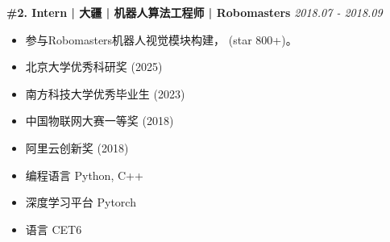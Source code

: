 \documentclass{resume}
\begin{document}
\textbf{\#2. Intern | 大疆 | 机器人算法工程师 | Robomasters}
\hfill \textit{2018.07 - 2018.09}\\\vspace{-15pt}%
\begin{itemize}[label=\textbullet, leftmargin=*]
\item 参与Robomasters机器人视觉模块构建， (star 800+)。
\end{itemize}


\begin{itemize}
\item 北京大学优秀科研奖 (2025)      
\item 南方科技大学优秀毕业生 (2023) 
      \item 中国物联网大赛一等奖 (2018)
      \item 阿里云创新奖 (2018)
\end{itemize}

\vspace{5pt}

\begin{itemize}
      \item 编程语言 \hspace{0.765cm} Python, C++ 
      \item 深度学习平台 \hspace{0.12cm} Pytorch 
      \item 语言 \hspace{1.4cm} CET6 
\end{itemize}
\end{document}
